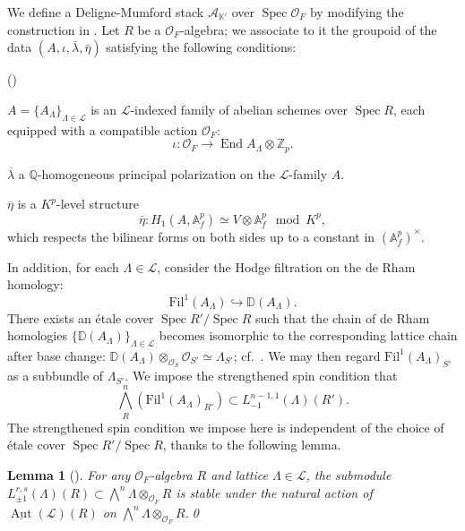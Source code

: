 \documentclass[pdflatex,sn-mathphys-num]{sn-jnl}%
\theoremstyle{thmstyleone}%
\newtheorem{lemma}[subsubsection]{Lemma}%
\theoremstyle{thmstyletwo}%
\numberwithin{equation}{subsection}
\theoremstyle{thmstylethree}%
\newcommand{\BA}{\ensuremath{\mathbb{A}}\xspace}
\newcommand{\BD}{\ensuremath{\mathbb{D}}\xspace}
\newcommand{\BK}{\ensuremath{\mathbb{K}}\xspace}
\newcommand{\BQ}{\ensuremath{\mathbb{Q}}\xspace}
\newcommand{\BZ}{\ensuremath{\mathbb{Z}}\xspace}
\newcommand{\CA}{\ensuremath{\mathcal{A}}\xspace}
\newcommand{\CL}{\ensuremath{\mathcal{L}}\xspace}
\newcommand{\CO}{\ensuremath{\mathcal{O}}\xspace}
\DeclareMathOperator{\Aut}{Aut}
\DeclareMathOperator{\End}{End}
\newcommand{\Fil}{\ensuremath{\mathrm{Fil}}\xspace}
\DeclareMathOperator{\Spec}{Spec}
\newcommand{\ov}{\overline}
\newenvironment{altenumerate}
	{\begin{list}
			{(\theenumi) }
			{\usecounter{enumi}
				\setlength{\labelwidth}{0pt}
				\setlength{\labelsep}{0pt}
				\setlength{\leftmargin}{0pt}
				\setlength{\itemsep}{\the\smallskipamount}
				\renewcommand{\theenumi}{\roman{enumi}}
		}}
		{\end{list}}
\begin{document}
		
We define a Deligne-Mumford stack $\CA_{\BK'}$ over $\Spec\CO_F$ by modifying the construction in \cite{RZ}.
Let $R$ be a $\CO_F$-algebra; we associate to it the groupoid of the data $(A,\iota,\bar{\lambda},\bar{\eta})$ satisfying the following conditions:
\begin{altenumerate}
	\item $A=\{A_\Lambda\}_{\Lambda\in\CL}$ is an $\CL$-indexed family of abelian schemes over $\Spec R$, each equipped with a compatible action $\CO_F$:
 \begin{equation*}
     \iota:\CO_F\rightarrow \End{A_\Lambda}\otimes \BZ_p.
 \end{equation*}
	\item $\ov{\lambda}$ a $\BQ$-homogeneous principal polarization on the $\CL$-family $A$.
	\item $\ov{\eta}$ is a $K^p$-level structure
	\begin{equation*}
		\ov{\eta}: H_1(A,\BA_f^p)\simeq V\otimes \BA_f^p\mod K^p,
	\end{equation*}
	which respects the bilinear forms on both sides up to a constant in $(\BA_f^p)^\times$.
\end{altenumerate}
In addition, for each $\Lambda\in \CL$, consider the Hodge filtration on the de Rham homology:
\begin{equation}\label{application_Shimura:hodge-fil}
	\Fil^1(A_\Lambda)\hookrightarrow \BD(A_\Lambda).
\end{equation}
There exists an  \'etale cover $\Spec R'/\Spec R$ such that the chain of de Rham homologies $\{\BD(A_\Lambda)\}_{\Lambda\in \CL}$ becomes isomorphic to the corresponding lattice chain after base change: $\BD(A_\Lambda)\otimes_{\CO_S}\CO_{S'}\simeq \Lambda_{S'}$; cf.\ \cite[Appendix to Chapter 3]{RZ}.
We may then regard $\Fil^1(A_{\Lambda})_{S'}$ as a subbundle of $\Lambda_{S'}$. 
We impose the strengthened spin condition that
\begin{equation*}
	\bigwedge^n_R(\Fil^1(A_\Lambda)_{R'})\subset L_{-1}^{n-1,1}(\Lambda)(R').
\end{equation*}
The strengthened spin condition we impose here is independent of the choice of \'etale cover $\Spec R'/\Spec R$, thanks to the following lemma.

\begin{lemma}[]\label{application_shimura_strengthened-spin}
	For any $\CO_F$-algebra $R$ and lattice $\Lambda\in\CL$, the submodule $L^{r,s}_{\pm 1}(\Lambda)(R)\subset \bigwedge^n\Lambda\otimes_{\CO_F}R$ is stable under the natural action of $\underline{\Aut}(\CL)(R)$ on $\bigwedge^n\Lambda\otimes_{\CO_F}R$.\qed
\end{lemma}
		
\end{document}
